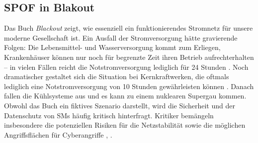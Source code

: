 \documentclass[a4paper,12pt]{article}
\begin{document}
\subsection{\ac{SPOF} in Blakout}
Das Buch \textit{Blackout} zeigt, wie essenziell ein funktionierendes Stromnetz für unsere moderne Gesellschaft ist. Ein Ausfall der Stromversorgung hätte gravierende Folgen: Die Lebensmittel- und Wasserversorgung kommt zum Erliegen, Krankenhäuser können nur noch für begrenzte Zeit ihren Betrieb aufrechterhalten – in vielen Fällen reicht die Notstromversorgung lediglich für 24 Stunden \cite{NotstromKrankenhaus}. Noch dramatischer gestaltet sich die Situation bei Kernkraftwerken, die oftmals lediglich eine Notstromversorgung von 10 Stunden gewährleisten können \cite[S. 11, Abschnitt 3.1.(9)]{NotstromAKWs}. Danach fallen die Kühlsysteme aus und es kann zu einem nuklearen Supergau kommen.
Obwohl das Buch ein fiktives Szenario darstellt, wird die Sicherheit und der Datenschutz von \acp{SM} häufig kritisch hinterfragt. Kritiker bemängeln insbesondere die potenziellen Risiken für die Netzstabilität sowie die möglichen Angriffsflächen für Cyberangriffe \cite{SmartMeterBlackout}, \cite{SmartMeterSicherheit}.



\end{document}
